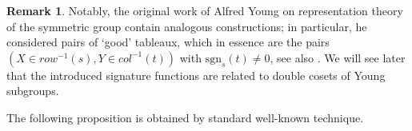 \documentclass[12pt, reqno]{amsart}
\theoremstyle{definition}
\newtheorem{remark}{Remark}[section]
\newcommand{\sgn}{\mathrm{sgn}}
\begin{document}
\begin{remark}
    Notably, the original work \cite{young} of Alfred Young on representation theory of the symmetric group contain analogous constructions; in particular, he considered pairs of `good' tableaux, which in essence are the pairs $(X \in row^{-1}(s), Y \in col^{-1}(t))$ with $\sgn_s(t) \neq 0$, see also \cite{garsia}. We will see later that the introduced signature functions are related to double cosets of Young subgroups.
\end{remark}



The following proposition is obtained by standard well-known technique. 
\end{document}
